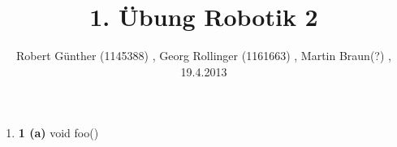 \documentclass[10pt,a4paper]{article} [2003/01/01]
\title{1. Übung Robotik 2}
\author{ Robert Günther (1145388) , Georg Rollinger (1161663) , Martin Braun(?) , 19.4.2013}
\date{}
\begin{document}
\maketitle
\begin{enumerate}

\item[]{\textbf{1 (a)}
   void foo()
}



\end{enumerate}
\end{document}
